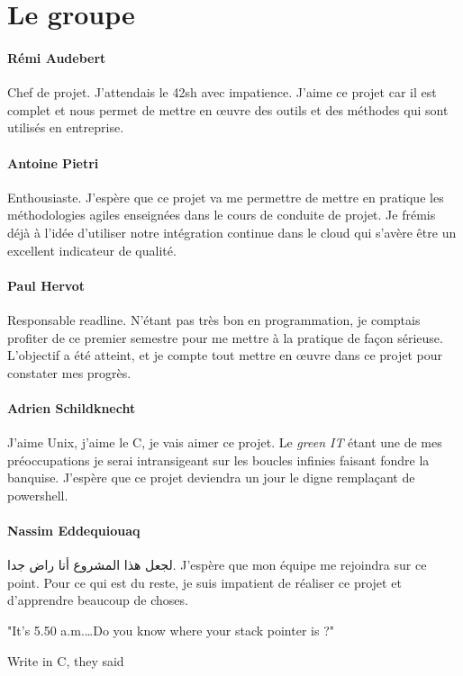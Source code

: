 \section{Le groupe}

\paragraph{Rémi Audebert} Chef de projet. J'attendais le 42sh avec impatience.
J'aime ce projet car il est complet et nous permet de mettre en œuvre des
outils et des méthodes qui sont utilisés en entreprise.

\paragraph{Antoine Pietri} Enthousiaste. J'espère que ce projet va me permettre
de mettre en pratique les méthodologies agiles enseignées dans le cours de
conduite de projet. Je frémis déjà à l'idée d'utiliser notre intégration
continue dans le cloud qui s'avère être un excellent indicateur de qualité.

\paragraph{Paul Hervot} Responsable readline. N'étant pas très bon en
programmation, je comptais profiter de ce premier semestre pour me mettre à la
pratique de façon sérieuse. L'objectif a été atteint, et je compte tout mettre
en œuvre dans ce projet pour constater mes progrès.

\paragraph{Adrien Schildknecht} J'aime Unix, j'aime le C, je vais aimer ce
projet. Le \textit{green IT} étant une de mes préoccupations je serai
intransigeant sur les boucles infinies faisant fondre la banquise.
J'espère que ce projet deviendra un jour le digne remplaçant de powershell.

\paragraph{Nassim Eddequiouaq} لجعل هذا المشروع أنا راض جدا. J’espère que mon
équipe me rejoindra sur ce point. Pour ce qui est du reste, je suis impatient
de réaliser ce projet et d’apprendre beaucoup de choses.

\epigraph{
         "It's 5.50 a.m.\ldots Do you know where your stack pointer is ?"
}{Write in C, they said}
